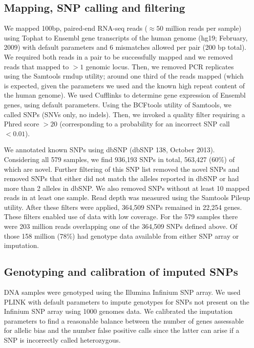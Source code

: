 \documentclass[letterpaper]{article}
\begin{document}
\subsection{Mapping, SNP calling and filtering}

We mapped 100bp, paired-end RNA-seq reads (\(\approx50\) million reads per sample) using Tophat
to Ensembl gene transcripts of the human genome (hg19; February, 2009) with
default parameters and 6 mismatches allowed per pair (200 bp total). We
required both reads in a pair to be successfully mapped and we removed reads
that mapped to \(>1\) genomic locus. Then, we removed PCR replicates using the
Samtools rmdup utility; around one third of the reads mapped (which is
expected, given the parameters we used and the known high repeat content of
the human genome). We used Cufflinks to determine gene expression of Ensembl
genes, using default parameters. Using the BCFtools utility of Samtools, we
called SNPs (SNVs only, no indels). Then, we invoked a quality filter
requiring a Phred score \(>20\) (corresponding to a probability for an
incorrect SNP call \(<0.01\)).

We annotated known SNPs using dbSNP (dbSNP 138, October 2013). Considering all
579 samples, we find 936,193 SNPs in total, 563,427 (60\%) of which are novel.
Further filtering of this SNP list removed the novel SNPs and removed SNPs
that either did not match the alleles reported in dbSNP or had more than 2
alleles in dbSNP. We also removed SNPs without at least 10 mapped reads in at
least one sample. Read depth was measured using the Samtools Pileup utility.
After these filters were applied, 364,509 SNPs remained in 22,254 genes. These
filters enabled use of data with low coverage.  For the 579
samples there were 203 million reads overlapping one of the
364,509 SNPs defined above.  Of those 158 million (78\%) had genotype data
available from either SNP array or imputation.

\subsection{Genotyping and calibration of imputed SNPs}

DNA samples were genotyped using the Illumina Infinium SNP array. We used
PLINK with default parameters to impute genotypes for SNPs not present on the
Infinium SNP array using 1000 genomes data.  We calibrated the
imputation parameters to find a reasonable balance between the number of genes
assessable for allelic bias and the number false positive
calls since the latter can arise if a SNP is
incorrectly called heterozygous.
\end{document}
